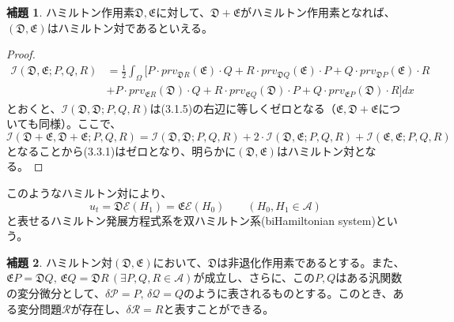 \documentclass[a4paper, 11pt]{report}
\theoremstyle{definition}
\newtheorem{lemma}{補題}[section]
\begin{document}
\begin{lemma}
 ハミルトン作用素$\mathfrak{D},\mathfrak{E}$に対して、$\mathfrak{D}+\mathfrak{E}$がハミルトン作用素となれば、$(\mathfrak{D},\mathfrak{E})$はハミルトン対であるといえる。
\end{lemma}

\begin{proof}
\begin{align}
\mathcal{I}(\mathfrak{D},\mathfrak{E};P,Q,R) &= \frac{1}{2}\int_\Omega [P\cdot prv_{\mathfrak{D}R}(\mathfrak{E})\cdot Q + R\cdot prv_{\mathfrak{D}Q}(\mathfrak{E})\cdot P + Q\cdot prv_{\mathfrak{D}P}(\mathfrak{E})\cdot R  \nonumber\\
&+ P\cdot prv_{\mathfrak{E}R}(\mathfrak{D})\cdot Q + R\cdot prv_{\mathfrak{E}Q}(\mathfrak{D})\cdot P + Q\cdot prv_{\mathfrak{E}P}(\mathfrak{D})\cdot R]dx  %
\end{align}
とおくと、$\mathcal{I}(\mathfrak{D},\mathfrak{D};P,Q,R)$は(3.1.5)の右辺に等しくゼロとなる（$\mathfrak{E},\mathfrak{D}+\mathfrak{E}$についても同様）。ここで、
\begin{equation*}
\mathcal{I}(\mathfrak{D}+\mathfrak{E},\mathfrak{D}+\mathfrak{E};P,Q,R) = \mathcal{I}(\mathfrak{D},\mathfrak{D};P,Q,R) + 2\cdot\mathcal{I}(\mathfrak{D},\mathfrak{E};P,Q,R) +\mathcal{I}(\mathfrak{E},\mathfrak{E};P,Q,R)
\end{equation*}
となることから(3.3.1)はゼロとなり、明らかに$(\mathfrak{D},\mathfrak{E})$はハミルトン対となる。
\end{proof}

 このようなハミルトン対により、
\begin{equation}
u_t = \mathfrak{D}\mathcal{E}(H_1) = \mathfrak{E}\mathcal{E}(H_0) \qquad (H_0,H_1\in\mathcal{A})  %
\end{equation}
と表せるハミルトン発展方程式系を双ハミルトン系(biHamiltonian system)という。

\begin{lemma}
 ハミルトン対$(\mathfrak{D},\mathfrak{E})$において、$\mathfrak{D}$は非退化作用素であるとする。また、$\mathfrak{E}P=\mathfrak{D}Q, \, \mathfrak{E}Q=\mathfrak{D}R \, (\exists P,Q,R\in\mathcal{A})$が成立し、さらに、この$P,Q$はある汎関数の変分微分として、$\delta\mathcal{P}=P, \, \delta\mathcal{Q}=Q$のように表されるものとする。このとき、ある変分問題$\mathcal{R}$が存在し、$\delta\mathcal{R}=R$と表すことができる。
\end{lemma}
\end{document}
